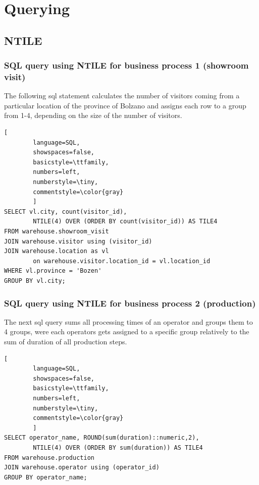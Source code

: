 \documentclass[letterpaper,12pt]{article}
\begin{document}
\section{Querying}

\subsection{NTILE}

\subsubsection{SQL query using NTILE for business process 1 (showroom visit)}

The following sql statement calculates the number of visitors coming from a particular location of the province of Bolzano and assigns each row to a group from 1-4, depending on the size of the number of visitors.

\begin{lstlisting}[
        language=SQL,
        showspaces=false,
        basicstyle=\ttfamily,
        numbers=left,
        numberstyle=\tiny,
        commentstyle=\color{gray}
        ]	 
SELECT vl.city, count(visitor_id), 
        NTILE(4) OVER (ORDER BY count(visitor_id)) AS TILE4
FROM warehouse.showroom_visit
JOIN warehouse.visitor using (visitor_id)
JOIN warehouse.location as vl 
        on warehouse.visitor.location_id = vl.location_id 
WHERE vl.province = 'Bozen'
GROUP BY vl.city;
\end{lstlisting}
      
\subsubsection{SQL query using NTILE for business process 2 (production)}

The next sql query sums all processing times of an operator and groups them to 4 groups, were each operators gets assigned to a specific group relatively to the sum of duration of all production steps.

\begin{lstlisting}[
        language=SQL,
        showspaces=false,
        basicstyle=\ttfamily,
        numbers=left,
        numberstyle=\tiny,
        commentstyle=\color{gray}
        ]
SELECT operator_name, ROUND(sum(duration)::numeric,2), 
        NTILE(4) OVER (ORDER BY sum(duration)) AS TILE4
FROM warehouse.production
JOIN warehouse.operator using (operator_id)
GROUP BY operator_name;
\end{lstlisting}
\end{document}
